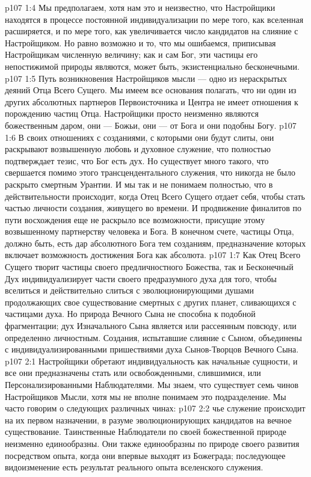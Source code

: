 \vs p107 1:4 Мы предполагаем, хотя нам это и неизвестно, что Настройщики находятся в процессе постоянной индивидуализации по мере того, как вселенная расширяется, и по мере того, как увеличивается число кандидатов на слияние с Настройщиком. Но равно возможно и то, что мы ошибаемся, приписывая Настройщикам численную величину; как и сам Бог, эти частицы его непостижимой природы являются, может быть, экзистенциально бесконечными.
\vs p107 1:5 Путь возникновения Настройщиков мысли --- одно из нераскрытых деяний Отца Всего Сущего. Мы имеем все основания полагать, что ни один из других абсолютных партнеров Первоисточника и Центра не имеет отношения к порождению частиц Отца. Настройщики просто неизменно являются божественным даром, они --- Божьи, они --- от Бога и они подобны Богу.
\vs p107 1:6 В своих отношениях с созданиями, с которыми они будут слиты, они раскрывают возвышенную любовь и духовное служение, что полностью подтверждает тезис, что Бог есть дух. Но существует много такого, что свершается помимо этого трансцендентального служения, что никогда не было раскрыто смертным Урантии. И мы так и не понимаем полностью, что в действительности происходит, когда Отец Всего Сущего отдает себя, чтобы стать частью личности создания, живущего во времени. И продвижение финалитов по пути восхождения еще не раскрыло все возможности, присущие этому возвышенному партнерству человека и Бога. В конечном счете, частицы Отца, должно быть, есть дар абсолютного Бога тем созданиям, предназначение которых включает возможность достижения Бога как абсолюта.
\vs p107 1:7 \pc Как Отец Всего Сущего творит частицы своего предличностного Божества, так и Бесконечный Дух индивидуализирует части своего предразумного духа для того, чтобы вселиться и действительно слиться с эволюционирующими душами продолжающих свое существование смертных с других планет, сливающихся с частицами духа. Но природа Вечного Сына не способна к подобной фрагментации; дух Изначального Сына является или рассеянным повсюду, или определенно личностным. Создания, испытавшие слияние с Сыном, объединены с индивидуализированными пришествиями духа Сынов\hyp{}Творцов Вечного Сына.
\vs p107 2:1 Настройщики обретают индивидуальность как начальные сущности, и все они предназначены стать или освобожденными, слившимися, или Персонализированными Наблюдателями. Мы знаем, что существует семь чинов Настройщиков Мысли, хотя мы не вполне понимаем это подразделение. Мы часто говорим о следующих различных чинах:
\vs p107 2:2 \bibnobreakspace {} чье служение происходит на их первом назначении, в разуме эволюционирующих кандидатов на вечное существование. Таинственные Наблюдатели по своей божественной природе неизменно единообразны. Они также единообразны по природе своего развития посредством опыта, когда они впервые выходят из Божеграда; последующее видоизменение есть результат реального опыта вселенского служения.
